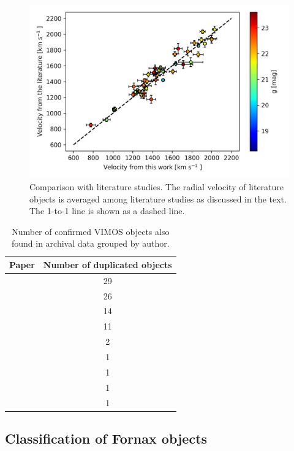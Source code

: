 \documentclass[usenatbib]{mnras}
\begin{document}
\begin{figure}
\centering
\includegraphics[width=\columnwidth]{figures/vel_literature.png}
\caption{Comparison with literature studies. The radial velocity of literature
objects is averaged among literature studies as discussed in the text. The 1-to-1
line is shown as a dashed line. }
\label{fig:vel_comparison}
\end{figure}

\begin{table}
\centering
\label{mathmode}
\begin{tabular}{@{}l c}
\hline
Paper & Number of duplicated objects \\
\hline
\citet{Dirsch04}       &  29 \\
\citet{Schuberth}      &  26 \\
\citet{Bergond07}      &  14 \\
\citet{Firth07}        &  11 \\
\citet{Chilingarian11} &  2  \\
\citet{Mieske04}       &  1  \\
\citet{Hilker07}       &  1  \\
\citet{Francis12}      &  1  \\
\citet{Drinkwater00}   &  1  \\
\hline
\end{tabular}
\caption{Number of confirmed VIMOS objects also found in archival data grouped
by author.}
\label{tab:authors}
\end{table}

\subsection{Classification of Fornax objects}
\end{document}
